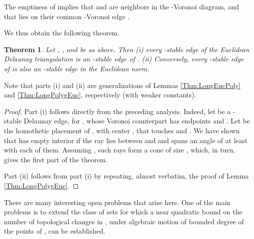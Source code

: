 \documentclass[letter,11pt]{article}
\newtheorem{theorem}{Theorem}[section]
\begin{document}
 The emptiness of  implies that  and 
 are neighbors in the -Voronoi diagram, and that  lies on 
their common -Voronoi edge .


We thus obtain the following theorem.
\begin{theorem} 
Let , , and  be as above. Then (i) every -stable edge of the Euclidean Delaunay triangulation is an -stable edge of . (ii) Conversely, every -stable edge of  is also an -stable edge in the Euclidean norm.
\end{theorem}
Note that parts (i) and (ii) are generalizations of Lemmas \ref{Thm:LongEucPoly} and \ref{Thm:LongPolygEuc}, respectively (with weaker constants).
\begin{proof}
Part (i) follows directly from the preceding analysis. Indeed, let  be a -stable Delaunay edge, for , whose Voronoi counterpart has endpoints  and . Let  be the homothetic placement of , with center , that touches  and . We have shown that  has empty interior if the ray  lies between  and  and spans an angle of at least  with each of them. Assuming , such rays  form a cone of size , which, in turn, gives the first part of the theorem. 

Part (ii) follows from part (i) by repeating, almost verbatim, the proof of Lemma \ref{Thm:LongPolygEuc}.
\end{proof}

There are many interesting open problems that arise here. One of the main problems is to extend the class of sets  for which a near quadratic bound on the number of topological changes in , under algebraic motion of bounded degree of the points of , can be established.
\end{document}
